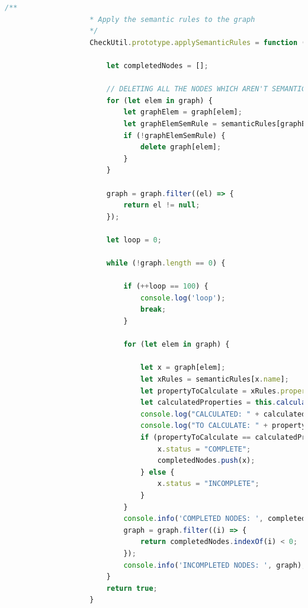                 \begin{lstlisting}[language=JavaScript, basicstyle=\tiny, caption={La funzione che computa tutte le proprietà semantiche}, label={lst:applySemanticRules}]
                    /**
                    * Apply the semantic rules to the graph
                    */
                    CheckUtil.prototype.applySemanticRules = function (graph, semanticRules) {

                        let completedNodes = [];

                        // DELETING ALL THE NODES WHICH AREN'T SEMANTIC RULES
                        for (let elem in graph) {
                            let graphElem = graph[elem];
                            let graphElemSemRule = semanticRules[graphElem.name];
                            if (!graphElemSemRule) {
                                delete graph[elem];
                            }
                        }

                        graph = graph.filter((el) => {
                            return el != null;
                        });

                        let loop = 0;

                        while (!graph.length == 0) {

                            if (++loop == 100) {
                                console.log('loop');
                                break;
                            }

                            for (let elem in graph) {

                                let x = graph[elem];
                                let xRules = semanticRules[x.name];
                                let propertyToCalculate = xRules.property.length;
                                let calculatedProperties = this.calculateProperties(x, xRules);
                                console.log("CALCULATED: " + calculatedProperties);
                                console.log("TO CALCULATE: " + propertyToCalculate);
                                if (propertyToCalculate == calculatedProperties) {
                                    x.status = "COMPLETE";
                                    completedNodes.push(x);
                                } else {
                                    x.status = "INCOMPLETE";
                                }
                            }
                            console.info('COMPLETED NODES: ', completedNodes);
                            graph = graph.filter((i) => {
                                return completedNodes.indexOf(i) < 0;
                            });
                            console.info('INCOMPLETED NODES: ', graph);
                        }
                        return true;
                    }
                \end{lstlisting}


